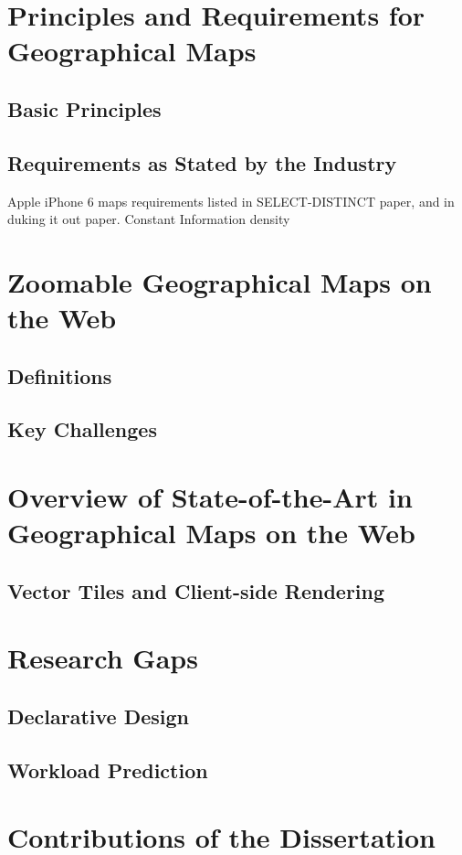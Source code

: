 \documentclass[11pt, oneside]{report}   	%
\begin{document}
\section{Principles and Requirements for Geographical Maps}
\subsection{Basic Principles}
\subsection{Requirements as Stated by the Industry}
Apple iPhone 6 maps requirements listed in SELECT-DISTINCT paper, and in duking it out paper. Constant Information density

\section{Zoomable Geographical Maps on the Web}
\subsection{Definitions}
\subsection{Key Challenges}

\section{Overview of State-of-the-Art in Geographical Maps on the Web}
\subsection{Vector Tiles and Client-side Rendering}


\section{Research Gaps}
\subsection{Declarative Design}
\subsection{Workload Prediction}

\section{Contributions of the Dissertation}
\end{document}
